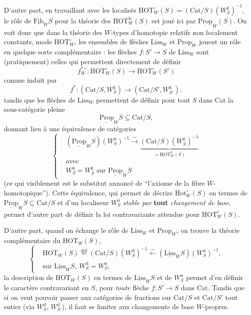 \documentclass[11pt]{article}
\newcommand{\printedpage}[1]{\marginpar{\footnotesize p.~#1}}
\newcommand{\msp}[1]{\marginpar{\footnotesize [#1]}}
\newcommand{\deff}{\overset{\text{déf}}{=}}
\begin{document}
D'autre part, en travaillant avec les localisés $\mathrm{HOT}^\circ_W(S) = (\mathrm{Cat}/S)(W^{\mathrm{g}}_S)^{-1}$, le rôle de $\underline{\mathrm{Fib}}_W S$ pour la théorie des $\mathrm{HOT}^{\mathrm{lc}}_W(S)$ est joué ici par $\underline{\mathrm{Prop}}_W(S)$. On voit donc que dans la théorie des $W$-types d'homotopie relatifs non localement constants, mode $\mathrm{HOT}^\circ_W$, les ensembles de flèches $\mathrm{Liss}_W$ et $\mathrm{Prop}_W$ jouent un rôle en quelque sorte complémentaire : les flèches $f : S' \longrightarrow S$ de $\mathrm{Liss}_W$ sont (pratiquement) celles qui permettent directement de définir
\[
f^{*\circ}_W : \mathrm{HOT}^\circ_W(S) \longrightarrow \mathrm{HOT}^\circ_W(S')
\]
comme induit par
\[
f^* : (\mathrm{Cat}/S, W^{\mathrm{g}}_S) \longrightarrow (\mathrm{Cat}/S', W^{\mathrm{g}}_{S'}),
\]
tandis que les flèches de $\mathrm{Liss}_W$ permettent de définir pour tout $S$ dans Cat la sous-catégorie pleine
\[
\underline{\mathrm{Prop}}_W S \subseteq \mathrm{Cat}/S,
\]
donnant lieu à une équivalence de catégories
\[
\left\{
\begin{aligned}
&(\underline{\mathrm{Prop}}_W S)(W^{\mathrm{u}}_S)^{-1} \xrightarrow{\sim} \underbrace{(\mathrm{Cat}/S)(W^{\mathrm{g}}_S)^{-1}}_{= \mathrm{HOT}^0_W(S)} %
\\
&\text{avec}\\
&W^{\mathrm{u}}_S = W^{\mathrm{g}}_S \text{ sur } \underline{\mathrm{Prop}}_W S
\end{aligned}
\right.
\]
(ce qui visiblement est le substitut annoncé de ``l'axiome de la fibre $W$-homotopique''). Cette
\msp{page 224}
équivalence, qui permet de décrire $\mathrm{Hot}^\circ_W(S)$ en termes de $\underline{\mathrm{Prop}}_W S \subseteq \mathrm{Cat}/S$ et d'un localiseur $W^{\mathrm{u}}_S$ \textit{stable par} \textbf{tout} \textit{changement de base,} permet d'autre part de définir la loi contravariante attendue pour $\mathrm{HOT}^\circ_W(S)$.

\printedpage{143}

D'autre part, quand on échange le rôle de $\mathrm{Liss}_W$ et $\mathrm{Prop}_W$, on trouve la théorie complémentaire du $\mathrm{HOT}_W(S)$,
\[
\left\{
\begin{aligned}
&\mathrm{HOT}_W(S) \deff (\mathrm{Cat}/S)(W^{\mathrm{d}}_S)^{-1} \xleftarrow{\sim} (\underline{\mathrm{Liss}}_W S)(W^{\mathrm{u}}_S)^{-1},\\
&\text{sur } \underline{\mathrm{Liss}}_W S,\ W^{\mathrm{d}}_S = W^{\mathrm{u}}_S,
\end{aligned}
\right.
\]
la description de $\mathrm{HOT}_W(S)$ en termes de $\underline{\mathrm{Liss}}_W S$ et de $W^{\mathrm{u}}_S$ permet d'en définir le caractère contravariant en $S$, pour \textit{toute} flèche $f : S' \longrightarrow S$ dans Cat. Tandis que si on veut pouvoir passer aux catégories de fractions sur $\mathrm{Cat}/S$ et $\mathrm{Cat}/S'$ tout entier (via $W^{\mathrm{d}}_S$, $W^{\mathrm{d}}_{S'}$), il faut se limiter aux changements de base $W$-propres.
\end{document}

